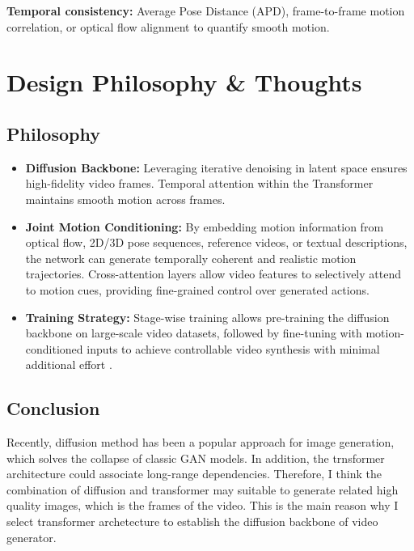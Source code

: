 \documentclass[11pt,a4paper]{article}
\begin{document}
\textbf{Temporal consistency:} Average Pose Distance (APD), frame-to-frame motion correlation, or optical flow alignment to quantify smooth motion.


\section{Design Philosophy \& Thoughts}
\subsection{Philosophy}
\begin{itemize}
    \item \textbf{Diffusion Backbone:} Leveraging iterative denoising in latent space ensures high-fidelity video frames. Temporal attention within the Transformer maintains smooth motion across frames.
    
    \item \textbf{Joint Motion Conditioning:} By embedding motion information from optical flow, 2D/3D pose sequences, reference videos, or textual descriptions, the network can generate temporally coherent and realistic motion trajectories. Cross-attention layers allow video features to selectively attend to motion cues, providing fine-grained control over generated actions.
    
    \item \textbf{Training Strategy:} Stage-wise training allows pre-training the diffusion backbone on large-scale video datasets, followed by fine-tuning with motion-conditioned inputs to achieve controllable video synthesis with minimal additional effort \cite{peng2025opensora20trainingcommerciallevel}.
\end{itemize}
\subsection{Conclusion}
Recently, diffusion method has been a popular approach for image generation, which solves the collapse of classic GAN models. In addition, the trnsformer architecture could associate long-range dependencies. Therefore, I think the combination of diffusion and transformer may suitable to generate related high quality images, which is the frames of the video. 
This is the main reason why I select transformer archetecture to establish the diffusion backbone of video generator.
\newpage


\end{document}
